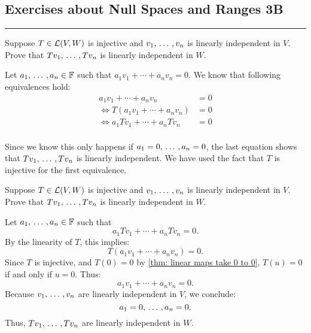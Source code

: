\subsection*{Exercises about Null Spaces and Ranges 3B}
\hrule
\phantom{.}

\setcounter{xrcs}{8}
\begin{xrcs}
  Suppose $T \in \mathcal{L}(V,W)$ is injective and $v_1, {\, \ldots \,\,}, v_n$ is linearly independent in $V$. Prove that $Tv_1, {\, \ldots \,\,}, Tv_n$ is linearly independent in $W$.
\end{xrcs}
\begin{prf}
  Let $a_1, {\, \ldots \,\,}, a_n \in \mathbb{F}$ such that $a_1 v_1 + \cdots + a_n v_n  = 0$. We know that following equivalences hold:
  \begin{equation}
    \begin{aligned}
              a_1 v_1 + \cdots + a_n v_n  &= 0 \\
      \iff T (a_1 v_1 + \cdots + a_n v_n) &= 0 \\
      \iff a_1 T v_1 + \cdots + a_n T v_n &= 0 \\
    \end{aligned}
  \end{equation}

  Since we know this only happens if $a_1 = 0, {\, \ldots \,\,}, a_n = 0$, the last equation shows that $T v_1, {\, \ldots \,\,}, T v_n$ is linearly independent. We have used the fact that $T$ is injective for the first equivalence.
\end{prf}

\begin{xrcs} %
  Suppose $T \in \mathcal{L}(V,W)$ is injective and $v_1, {\, \ldots \,\,}, v_n$ is linearly independent in $V$. Prove that $Tv_1, {\, \ldots \,\,}, Tv_n$ is linearly independent in $W$.
\end{xrcs}
\begin{prf}
  Let $a_1, {\, \ldots \,\,}, a_n \in \mathbb{F}$ such that
  \[
  a_1 Tv_1 + \cdots + a_n Tv_n = 0.
  \]
  By the linearity of $T$, this implies:
  \[
  T(a_1 v_1 + \cdots + a_n v_n) = 0.
  \]
  Since $T$ is injective, and $T(0)=0$ by \ref{thm: linear maps take 0 to 0}, \( T(u) = 0 \) if and only if \( u = 0 \). Thus:
  \[
  a_1 v_1 + \cdots + a_n v_n = 0.
  \]
  Because $v_1, {\, \ldots \,\,}, v_n$ are linearly independent in $V$, we conclude:
  \[
  a_1 = 0, {\, \ldots \,\,}, a_n = 0.
  \]
  Thus, $Tv_1, {\, \ldots \,\,}, Tv_n$ are linearly independent in $W$.
\end{prf}

